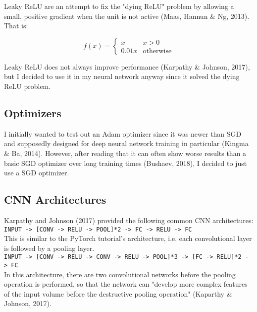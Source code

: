 \documentclass[11pt]{article}
\begin{document}
Leaky ReLU are an attempt to fix the "dying ReLU" problem by allowing a
small, positive gradient when the unit is not active (Maas, Hannun \&
Ng, 2013). That is:

 \[ f(x) =
\begin{cases} 
          x & x > 0 \\
          0.01x & \text{otherwise} 
       \end{cases}
    \]

Leaky ReLU does not always improve performance (Karpathy \& Johnson,
2017), but I decided to use it in my neural network anyway since it
solved the dying ReLU problem.

\subsection{Optimizers}\label{optimizers}

I initially wanted to test out an Adam optimizer since it was newer than
SGD and supposedly designed for deep neural network training in
particular (Kingma \& Ba, 2014). However, after reading that it can
often show worse results than a basic SGD optimizer over long training
times (Bushaev, 2018), I decided to just use a SGD optimizer.

\subsection{CNN Architectures}\label{cnn-architectures}

Karpathy and Johnson (2017) provided the following common CNN
architectures:\\

\texttt{INPUT\ -\textgreater{}\ {[}CONV\ -\textgreater{}\ RELU\ -\textgreater{}\ POOL{]}*2\ -\textgreater{}\ FC\ -\textgreater{}\ RELU\ -\textgreater{}\ FC}\\

This is similar to the PyTorch tutorial's architecture, i.e. each
convolutional layer is followed by a pooling layer.\\

\texttt{INPUT\ -\textgreater{}\ {[}CONV\ -\textgreater{}\ RELU\ -\textgreater{}\ CONV\ -\textgreater{}\ RELU\ -\textgreater{}\ POOL{]}*3\ -\textgreater{}\ {[}FC\ -\textgreater{}\ RELU{]}*2\ -\textgreater{}\ FC}\\

In this architecture, there are two convolutional networks before the
pooling operation is performed, so that the network can "develop more
complex features of the input volume before the destructive pooling
operation" (Kaparthy \& Johnson, 2017).
\end{document}
